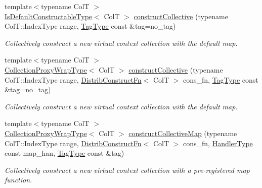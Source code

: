 \begin{DoxyCompactItemize}
{\footnotesize template$<$typename ColT $>$ }\\\hyperlink{structvt_1_1vrt_1_1collection_1_1_collection_manager_af8091fcb8218dad155ea028c9b5d283f}{Is\+Default\+Constructable\+Type}$<$ ColT $>$ \hyperlink{structvt_1_1vrt_1_1collection_1_1_collection_manager_a8b68495478d890c9b07bff01059be63e}{construct\+Collective} (typename Col\+T\+::\+Index\+Type range, \hyperlink{namespacevt_a84ab281dae04a52a4b243d6bf62d0e52}{Tag\+Type} const \&tag=no\+\_\+tag)
\begin{DoxyCompactList}\small\item\em Collectively construct a new virtual context collection with the default map. \end{DoxyCompactList}\item 
{\footnotesize template$<$typename ColT $>$ }\\\hyperlink{structvt_1_1vrt_1_1collection_1_1_collection_manager_a56458ed7f9bb22b631b9b3a745f42f94}{Collection\+Proxy\+Wrap\+Type}$<$ ColT $>$ \hyperlink{structvt_1_1vrt_1_1collection_1_1_collection_manager_ad68e773af13eaa96e58910b14264e8cb}{construct\+Collective} (typename Col\+T\+::\+Index\+Type range, \hyperlink{structvt_1_1vrt_1_1collection_1_1_collection_manager_a7503830bc133013d542856fa39834dcc}{Distrib\+Construct\+Fn}$<$ ColT $>$ cons\+\_\+fn, \hyperlink{namespacevt_a84ab281dae04a52a4b243d6bf62d0e52}{Tag\+Type} const \&tag=no\+\_\+tag)
\begin{DoxyCompactList}\small\item\em Collectively construct a new virtual context collection with the default map. \end{DoxyCompactList}\item 
{\footnotesize template$<$typename ColT $>$ }\\\hyperlink{structvt_1_1vrt_1_1collection_1_1_collection_manager_a56458ed7f9bb22b631b9b3a745f42f94}{Collection\+Proxy\+Wrap\+Type}$<$ ColT $>$ \hyperlink{structvt_1_1vrt_1_1collection_1_1_collection_manager_a1c6fff21fb84e87d1b52b07f92805725}{construct\+Collective\+Map} (typename Col\+T\+::\+Index\+Type range, \hyperlink{structvt_1_1vrt_1_1collection_1_1_collection_manager_a7503830bc133013d542856fa39834dcc}{Distrib\+Construct\+Fn}$<$ ColT $>$ cons\+\_\+fn, \hyperlink{namespacevt_af64846b57dfcaf104da3ef6967917573}{Handler\+Type} const map\+\_\+han, \hyperlink{namespacevt_a84ab281dae04a52a4b243d6bf62d0e52}{Tag\+Type} const \&tag)
\begin{DoxyCompactList}\small\item\em Collectively construct a new virtual context collection with a pre-\/registered map function. \end{DoxyCompactList}\item 

\end{DoxyCompactItemize}
